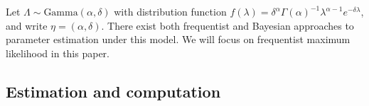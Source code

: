 \documentclass[oupdraft]{bio}
\begin{document}
Let $\Lambda \sim \text{Gamma}(\alpha, \delta)$ with distribution function $f(\lambda) = \delta^\alpha \Gamma (\alpha)^{-1} \lambda^{\alpha - 1} e^{-\delta \lambda}$, and write $\eta = (\alpha, \delta)$.
%
There exist both frequentist \citep{fisher_1943} and Bayesian \citep{efron_1976,barger_2010} approaches to parameter estimation under this model. We will focus on frequentist maximum likelihood in this paper.

\subsection{Estimation and computation}
\end{document}
